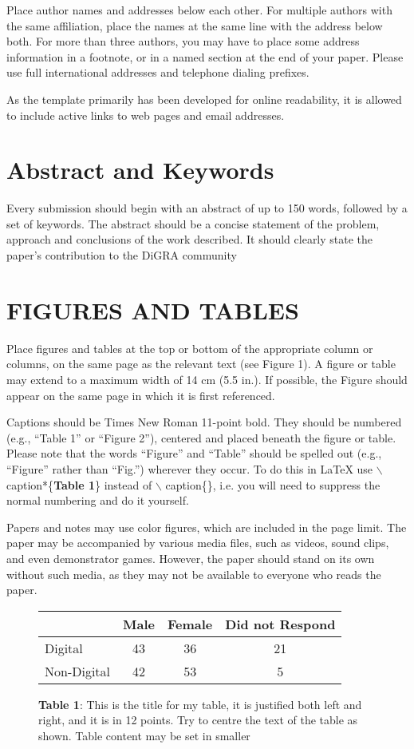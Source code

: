 \documentclass[11pt]{article}
\begin{document}
Place author names and addresses below each other. For multiple
authors with the same affiliation, place the names at the same line with the address below
both. For more than three authors, you may have to place some address information in a
footnote, or in a named section at the end of your paper. Please use full international
addresses and telephone dialing prefixes.

As the template primarily has been developed for online readability, it is allowed to
include active links to web pages and email addresses.
\section*{Abstract and Keywords}
Every submission should begin with an abstract of up to 150 words, followed by a set of
keywords. The abstract should be a concise statement of the problem, approach and
conclusions of the work described. It should clearly state the paper's contribution to the
DiGRA community
\section*{FIGURES AND TABLES}
Place figures and tables at the top or bottom of the appropriate column or columns, on the
same page as the relevant text (see Figure 1). A figure or table may extend to a maximum
width of 14 cm (5.5 in.). If possible, the Figure should appear on the same page in which
it is first referenced.

Captions should be Times New Roman 11-point bold. They should be numbered (e.g.,
“Table 1” or “Figure 2”), centered and placed beneath the figure or table. Please note that
the words “Figure” and “Table” should be spelled out (e.g., “Figure” rather than “Fig.”)
wherever they occur.  To do this in LaTeX use $\backslash$ caption*\{\textbf{Table 1}\} instead of  $\backslash$ caption\{\}, i.e. you will need to suppress the normal numbering and do it yourself.

Papers and notes may use color figures, which are included in the page limit. The paper
may be accompanied by various media files, such as videos, sound clips, and even
demonstrator games. However, the paper should stand on its own without such media, as
they may not be available to everyone who reads the paper.
\begin{figure}[h]
\centering
\begin{tabular}{| l | c | c | c |}
\hline
  & \textbf{Male} & \textbf{Female} & \textbf{Did not Respond} \\
  \hline
Digital &43 &36 &21\\
\hline
Non-Digital &42 &53 &5 \\
\hline
\end{tabular}
\caption*{\textbf{Table 1}: This is the title for my table, it is justified both left and right, and it is in 12
points. Try to centre the text of the table as shown. Table content may be set in smaller}
\end{figure}
\end{document}
